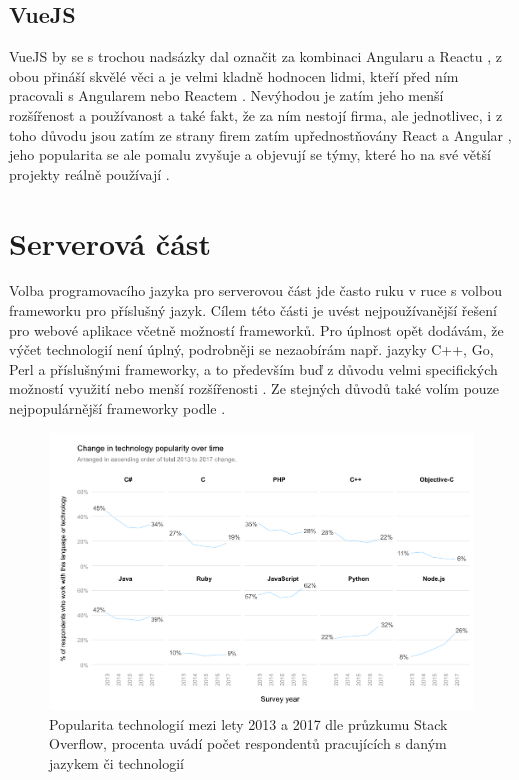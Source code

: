         \subsection{VueJS}
        VueJS by se s trochou nadsázky dal označit za kombinaci Angularu a Reactu \cite{js-fw5}, z obou přináší skvělé věci a je velmi kladně hodnocen lidmi, kteří před ním pracovali s Angularem nebo Reactem \cite{js-fw1}. Nevýhodou je zatím jeho menší rozšířenost a používanost \cite{js-fw1} a také fakt, že za ním nestojí firma, ale jednotlivec, i z toho důvodu jsou zatím ze strany firem zatím upřednostňovány React a Angular \cite{js-fw4}, jeho popularita se ale pomalu zvyšuje a objevují se týmy, které ho na své větší projekty reálně používají \cite{js-fw1}.
    
    
    \section{Serverová část}
    Volba programovacího jazyka pro serverovou část jde často ruku v ruce s volbou frameworku pro příslušný jazyk. Cílem této části je uvést nejpoužívanější řešení pro webové aplikace včetně možností frameworků. Pro úplnost opět dodávám, že výčet technologií není úplný, podrobněji se nezaobírám např. jazyky C++, Go, Perl a příslušnými frameworky, a to především buď z důvodu velmi specifických možností využití \cite{technologie-c++} nebo menší rozšířenosti \cite{stack-stats18}\cite{jetbrains-stats}. Ze stejných důvodů také volím pouze nejpopulárnější frameworky podle \cite{hot-frameworks}.
    
    \begin{figure}\centering
    	\includegraphics[width=1\textwidth]{img/stack-stats}
    	\caption[Popularita technologií mezi lety 2013 a 2017 dle průzkumu Stack Overflow]{Popularita technologií mezi lety 2013 a 2017 dle průzkumu Stack Overflow, procenta uvádí počet respondentů pracujících s daným jazykem či technologií \cite{stack-stats17}}\label{fig:stack-stats17}
    \end{figure}
    
